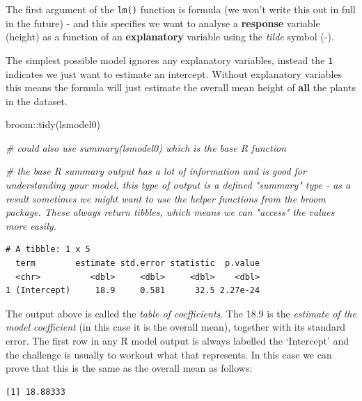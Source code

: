 \documentclass[
]{book}
\newenvironment{Shaded}{\begin{snugshade}}{\end{snugshade}}
\newcommand{\CommentTok}[1]{\textcolor[rgb]{0.56,0.35,0.01}{\textit{#1}}}
\newcommand{\FunctionTok}[1]{\textcolor[rgb]{0.00,0.00,0.00}{#1}}
\newcommand{\NormalTok}[1]{#1}
\newcommand{\SpecialCharTok}[1]{\textcolor[rgb]{0.00,0.00,0.00}{#1}}
\begin{document}
The first argument of the \texttt{lm()} function is formula (we won't write this out in full in the future) - and this specifies we want to analyse a \textbf{response} variable (height) as a function of an \textbf{explanatory} variable using the \emph{tilde} symbol (-).

The simplest possible model ignores any explanatory variables, instead the \texttt{1} indicates we just want to estimate an intercept. Without explanatory variables this means the formula will just estimate the overall mean height of \textbf{all} the plants in the dataset.

\begin{Shaded}
\begin{Highlighting}[]
\NormalTok{broom}\SpecialCharTok{::}\FunctionTok{tidy}\NormalTok{(lsmodel0)}

\CommentTok{\# could also use summary(lsmodel0) which is the base R function}

\CommentTok{\# the base R summary output has a lot of information and is good for understanding your model, this type of output is a defined "summary" type {-} as a result sometimes we might want to use the helper functions from the broom package. These always return tibbles, which means we can "access" the values more easily. }
\end{Highlighting}
\end{Shaded}

\begin{verbatim}
# A tibble: 1 x 5
  term        estimate std.error statistic  p.value
  <chr>          <dbl>     <dbl>     <dbl>    <dbl>
1 (Intercept)     18.9     0.581      32.5 2.27e-24
\end{verbatim}

The output above is called the \emph{table of coefficients}. The 18.9 is the \emph{estimate of the model coefficient} (in this case it is the overall mean), together with its standard error. The first row in any R model output is always labelled the `Intercept' and the challenge is usually to workout what that represents. In this case we can prove that this is the same as the overall mean as follows:

\begin{Shaded}
\end{Shaded}

\begin{verbatim}
[1] 18.88333
\end{verbatim}
\end{document}
